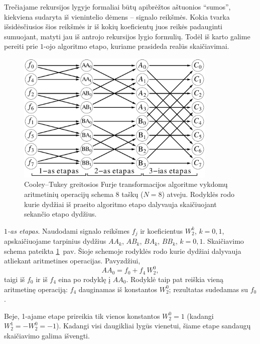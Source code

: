 \documentclass[a4paper,12pt]{article}
\begin{document}
\bigskip
Trečiajame rekursijos lygyje formaliai būtų apibrėžtos aštuonios ``sumos'', kiekviena sudaryta iš vienintelio dėmens -- signalo reikšmės.
Kokia tvarka išsidėsčiusios šios reikšmės ir iš kokių koeficientų juos reikės padauginti sumuojant, matyti jau iš antrojo rekursijos lygio formulių.
Todėl iš karto galime pereiti prie $1$-ojo algoritmo etapo, kuriame prasideda realūs skaičiavimai.


\begin{figure}[ht!]
    \centering
    \includegraphics[clip=true, width=0.85\textwidth]{figures/fig05.pdf}
    \caption{Cooley--Tukey greitosios Furje transformacijos algoritme vykdomų aritmetinių operacijų schema $8$ taškų ($N=8$) atveju.
    Rodyklės rodo kurie dydžiai iš praeito algoritmo etapo dalyvauja skaičiuojant sekančio etapo dydžius.}
    \label{pav05}
\end{figure}

\emph{$1$-as etapas}. Naudodami signalo reikšmes $f_j$ ir koeficientus $W_2^k$, $k=0,1$, apskaičiuojame tarpinius dydžius $AA_k$, $AB_k$, $BA_k$, $BB_k$, $k=0,1$.
Skaičiavimo schema pateikta \ref{pav05}~pav. Šioje schemoje rodyklės rodo kurie dydžiai dalyvauja atliekant aritmetines operacijas. Pavyzdžiui,
\[
    AA_0 = f_0  +  f_4\, W_2^{0},
\]
taigi iš $f_0$ ir iš $f_4$ eina po rodyklę į $AA_0$. Rodyklė taip pat reiškia vieną aritmetinę operaciją: $f_4$ dauginamas iš konstantos $W_2^{0}$; rezultatas sudedamas su $f_0$.

Beje, 1-ajame etape prireikia tik vienos konstantos $W_2^{0}=1$ (kadangi $W_2^{1}=-W_2^{0}=-1$).
Kadangi visi daugikliai lygūs vienetui, šiame etape sandaugų skaičiavimo galima išvengti.
\end{document}
